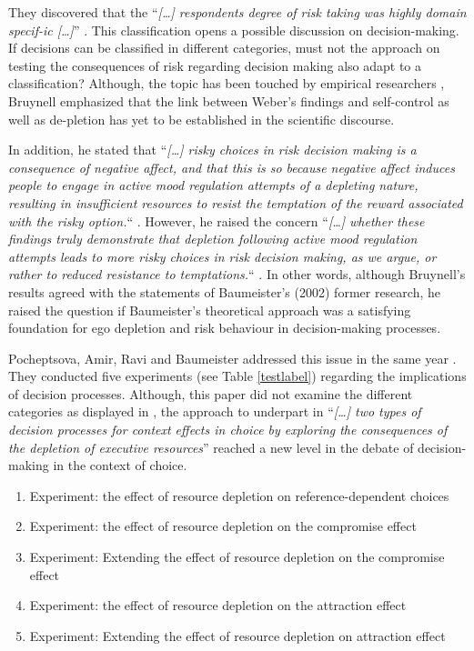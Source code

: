 They discovered that the “\emph{[\ldots] respondents degree of risk taking was highly domain specif-ic [\ldots]}” \citep[p.~263]{weber2002domain}. This classification opens a possible discussion on decision-making. If decisions can be classified in different categories, must not the approach on testing the consequences of risk regarding decision making also adapt to a classification? Although, the topic has been touched by empirical researchers \citep{ditto2006visceral}, Bruynell \citep{bruyneel2009felt} emphasized that the link between Weber’s findings and self-control as well as de-pletion has yet to be established in the scientific discourse.\par
In addition, he stated that “\emph{[\ldots] risky choices in risk decision making is a consequence of negative affect, and that this is so because negative affect induces people to engage in active mood regulation attempts of a depleting nature, resulting in insufficient resources to resist the temptation of the reward associated with the risky option.}“ \citep[p.~165]{bruyneel2009felt}. However, he raised the concern “\emph{[\ldots] whether these findings truly demonstrate that depletion following active mood regulation attempts leads to more risky choices in risk decision making, as we argue, or rather to reduced resistance to temptations.}“ \citep[p.~165]{bruyneel2009felt}. In other words, although Bruynell’s results agreed with the statements of Baumeister’s (2002) former research, he raised the question if Baumeister’s theoretical approach was a satisfying foundation for ego depletion and risk behaviour in decision-making processes.\par
Pocheptsova, Amir, Ravi and Baumeister addressed this issue in the same year \citep{pocheptsova2009deciding}. They conducted five experiments (see Table \ref{testlabel}) regarding the implications of decision processes. Although, this paper did not examine the different categories as displayed in \citep{weber2002domain}, the approach to underpart in “\emph{[\ldots] two types of decision processes for context effects in choice by exploring the consequences of the depletion of executive resources}” \citep{pocheptsova2009deciding} reached a new level in the debate of decision-making in the context of choice.
\begin{enumerate}[1.]
	\item Experiment: the effect of resource depletion on reference-dependent choices
	\item Experiment: the effect of resource depletion on the compromise effect
	\item Experiment: Extending the effect of resource depletion on the compromise effect
	\item Experiment: the effect of resource depletion on the attraction effect
	\item Experiment: Extending the effect of resource depletion on attraction effect
\label{testlabel}
\end{enumerate}
